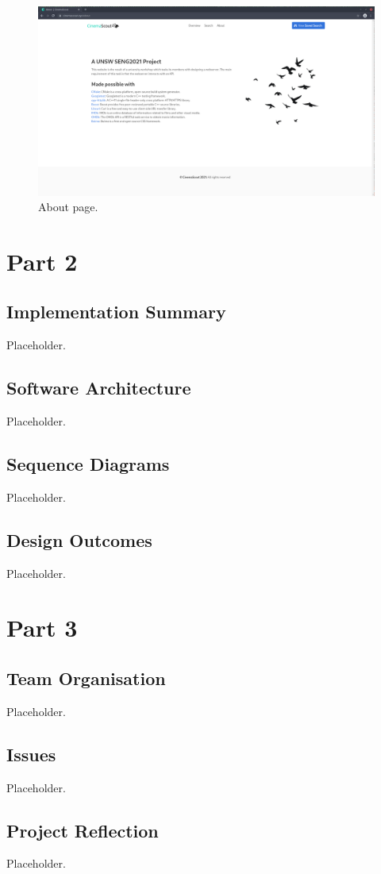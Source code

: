 \documentclass{article}
\begin{document}
\begin{figure}[H]
\includegraphics[width=\columnwidth]{res/about.png}
\caption{About page.}
\end{figure}
\newpage
\section{Part 2}
\subsection{Implementation Summary}
Placeholder.
\subsection{Software Architecture}
Placeholder.
\subsection{Sequence Diagrams}
Placeholder.
\subsection{Design Outcomes}
Placeholder.

\section{Part 3}
\subsection{Team Organisation}
Placeholder.
\subsection{Issues}
Placeholder.
\subsection{Project Reflection}
Placeholder.
\end{document}
